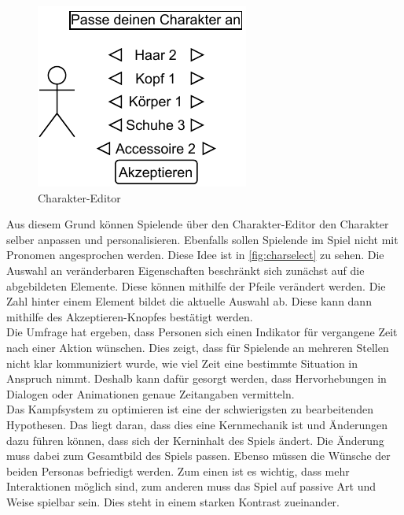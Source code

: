 \begin{figure}[H]
\centering
\includegraphics[width=0.5\columnwidth]{figures/wireframes/charselect.pdf}
\caption{\label{fig:charselect}Charakter-Editor}
\end{figure}

Aus diesem Grund können Spielende über den Charakter-Editor den Charakter selber anpassen und personalisieren. Ebenfalls sollen Spielende im Spiel nicht mit Pronomen angesprochen werden. Diese Idee ist in \autoref{fig:charselect} zu sehen. Die Auswahl an veränderbaren Eigenschaften beschränkt sich zunächst auf die abgebildeten Elemente. Diese können mithilfe der Pfeile verändert werden. Die Zahl hinter einem Element bildet die aktuelle Auswahl ab. Diese kann dann mithilfe des Akzeptieren-Knopfes bestätigt werden. \\

Die Umfrage hat ergeben, dass Personen sich einen Indikator für vergangene Zeit nach einer Aktion wünschen. Dies zeigt, dass für Spielende an mehreren Stellen nicht klar kommuniziert wurde, wie viel Zeit eine bestimmte Situation in Anspruch nimmt. Deshalb kann dafür gesorgt werden, dass Hervorhebungen in Dialogen oder Animationen genaue Zeitangaben vermitteln.\\

Das Kampfsystem zu optimieren ist eine der schwierigsten zu bearbeitenden Hypothesen. Das liegt daran, dass dies eine Kernmechanik ist und Änderungen dazu führen können, dass sich der Kerninhalt des Spiels ändert. Die Änderung muss dabei zum Gesamtbild des Spiels passen. Ebenso müssen die Wünsche der beiden Personas befriedigt werden. Zum einen ist es wichtig, dass mehr Interaktionen möglich sind, zum anderen muss das Spiel auf passive Art und Weise spielbar sein. Dies steht in einem starken Kontrast zueinander. \\

